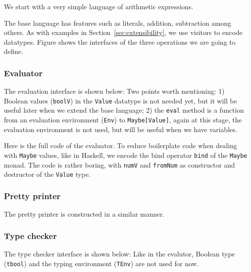 We start with a very simple language of arithmetic expressions.

The base language has features such as literals, addition, subtraction among
others. As with examples in Section~\ref{sec:extensibility}, we use visitors to
encode datatypes. Figure shows the interfaces of the three operations we are
going to define.





\subsubsection{Evaluator}

The evaluation interface is shown below:
Two points worth mentioning: 1) Boolean values (\lstinline{boolV}) in the
\lstinline{Value} datatype is not needed yet, but it will be useful later when
we extend the base language; 2) the \lstinline{eval} method is a function from
an evaluation environment (\lstinline{Env}) to \lstinline{Maybe[Value]}, again
at this stage, the evaluation environment is not used, but will be useful when
we have variables.

Here is the full code of the evaluator.
To reduce boilerplate code when dealing with \lstinline{Maybe} values, like in
Haskell, we encode the bind operator \lstinline{bind} of the \lstinline{Maybe}
monad. The code is rather boring, with \lstinline{numV} and \lstinline{fromNum}
as constructor and destructor of the \lstinline{Value} type.

\subsubsection{Pretty printer}

The pretty printer is constructed in a similar manner.

\subsubsection{Type checker}

The type checker interface is shown below:
Like in the evalutor, Boolean type (\lstinline{tbool}) and the typing
environment (\lstinline{TEnv}) are not used for now.

